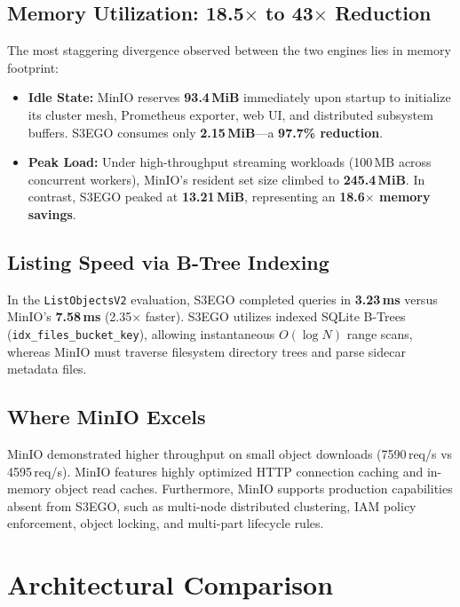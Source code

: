 \documentclass[11pt,a4paper]{article}
\begin{document}
\subsection{Memory Utilization: 18.5$\times$ to 43$\times$ Reduction}
The most staggering divergence observed between the two engines lies in memory footprint:
\begin{itemize}
    \item \textbf{Idle State:} MinIO reserves \textbf{93.4\,MiB} immediately upon startup to initialize its cluster mesh, Prometheus exporter, web UI, and distributed subsystem buffers. S3EGO consumes only \textbf{2.15\,MiB}—a \textbf{97.7\% reduction}.
    \item \textbf{Peak Load:} Under high-throughput streaming workloads (100\,MB across concurrent workers), MinIO's resident set size climbed to \textbf{245.4\,MiB}. In contrast, S3EGO peaked at \textbf{13.21\,MiB}, representing an \textbf{18.6$\times$ memory savings}.
\end{itemize}

\subsection{Listing Speed via B-Tree Indexing}
In the \texttt{ListObjectsV2} evaluation, S3EGO completed queries in \textbf{3.23\,ms} versus MinIO's \textbf{7.58\,ms} (2.35$\times$ faster). S3EGO utilizes indexed SQLite B-Trees (\texttt{idx\_files\_bucket\_key}), allowing instantaneous $O(\log N)$ range scans, whereas MinIO must traverse filesystem directory trees and parse sidecar metadata files.

\subsection{Where MinIO Excels}
MinIO demonstrated higher throughput on small object downloads (7590\,req/s vs 4595\,req/s). MinIO features highly optimized HTTP connection caching and in-memory object read caches. Furthermore, MinIO supports production capabilities absent from S3EGO, such as multi-node distributed clustering, IAM policy enforcement, object locking, and multi-part lifecycle rules.

\section{Architectural Comparison}
\end{document}
